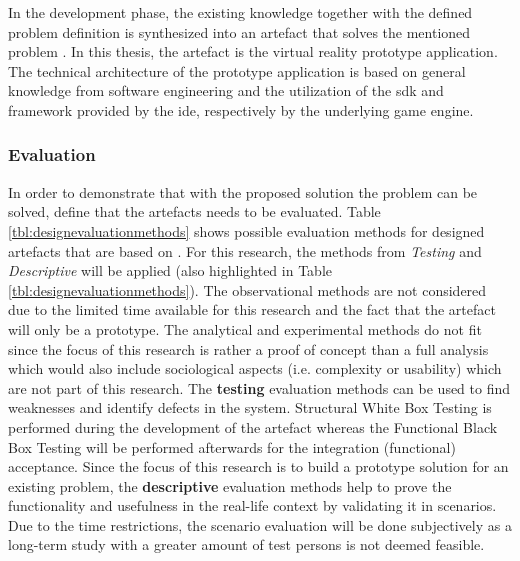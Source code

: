 In the development phase, the existing knowledge together with the defined problem definition is synthesized into an artefact that solves the mentioned problem \citep{Vaishnavi2008}. In this thesis, the artefact is the virtual reality prototype application. \newline
The technical architecture of the prototype application is based on general knowledge from software engineering and the utilization of the \gls{sdk} and framework provided by the \gls{ide}, respectively by the underlying game engine.



\subsubsection{Evaluation}

\label{EvaluationMethodology}

In order to demonstrate that with the proposed solution the problem can be solved, \cite{Hevner2010} define that the artefacts needs to be evaluated. Table \ref{tbl:designevaluationmethods} shows possible evaluation methods for designed artefacts that are based on \cite{Hevner2004}. For this research, the methods from \textit{Testing} and \textit{Descriptive} will be applied (also highlighted in Table \ref{tbl:designevaluationmethods}). The observational methods are not considered due to the limited time available for this research and the fact that the artefact will only be a prototype. The analytical and experimental methods do not fit since the focus of this research is rather a proof of concept than a full analysis which would also include sociological aspects (i.e. complexity or usability) which are not part of this research.\newline
The \textbf{testing} evaluation methods can be used to find weaknesses and identify defects in the system. Structural White Box Testing is performed during the development of the artefact whereas the Functional Black Box Testing will be performed afterwards for the integration (functional) acceptance. \newline
Since the focus of this research is to build a prototype solution for an existing problem, the \textbf{descriptive} evaluation methods help to prove the functionality and usefulness in the real-life context by validating it in scenarios. Due to the time restrictions, the scenario evaluation will be done subjectively as a long-term study with a greater amount of test persons is not deemed feasible.

